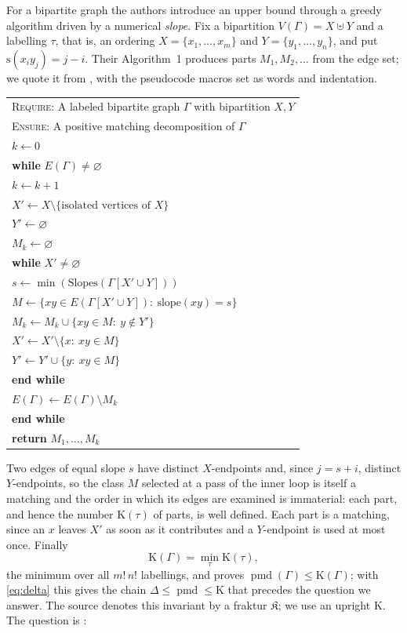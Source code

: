 \documentclass[11pt]{amsart}
\theoremstyle{remark}
\newcommand{\pmd}{\operatorname{pmd}}
\newcommand{\slope}{\mathrm{s}}
\newcommand{\Kinv}{\mathrm{K}}
\newcommand{\Gam}{\Gamma}
\begin{document}
For a bipartite graph the authors introduce an upper bound through a greedy
algorithm driven by a numerical \emph{slope}. Fix a bipartition
$V(\Gam)=X\uplus Y$ and a labelling $\tau$, that is, an ordering
$X=\{x_1,\dots,x_m\}$ and $Y=\{y_1,\dots,y_n\}$, and put
$\slope(x_iy_j)=j-i$. Their Algorithm~1 produces parts $M_1,M_2,\dots$ from the
edge set; we quote it from \cite{FGY}, with the pseudocode macros set as words
and indentation.

\medskip
\begin{center}\small
\begin{tabular}{@{}l@{}}
\textsc{Require}: A labeled bipartite graph $\Gam$ with bipartition $X,Y$\\
\textsc{Ensure}: A positive matching decomposition of $\Gam$\\
$k\longleftarrow 0$\\
\textbf{while} $E(\Gam)\neq\varnothing$\\
\quad $k\longleftarrow k+1$\\
\quad $X'\longleftarrow X\setminus\{\text{isolated vertices of }X\}$\\
\quad $Y'\longleftarrow\varnothing$\\
\quad $M_k\longleftarrow\varnothing$\\
\quad \textbf{while} $X'\neq\varnothing$\\
\quad\quad $s\longleftarrow\min(\mathrm{Slopes}(\Gam[X'\cup Y]))$\\
\quad\quad $M\longleftarrow\{xy\in E(\Gam[X'\cup Y])\colon\ \mathrm{slope}(xy)=s\}$\\
\quad\quad $M_k\longleftarrow M_k\cup\{xy\in M\colon\ y\notin Y'\}$\\
\quad\quad $X'\longleftarrow X'\setminus\{x\colon\ xy\in M\}$\\
\quad\quad $Y'\longleftarrow Y'\cup\{y\colon\ xy\in M\}$\\
\quad \textbf{end while}\\
\quad $E(\Gam)\longleftarrow E(\Gam)\setminus M_k$\\
\textbf{end while}\\
\textbf{return} $M_1,\ldots,M_k$
\end{tabular}
\end{center}

\medskip
Two edges of equal slope $s$ have distinct $X$-endpoints and, since $j=s+i$,
distinct $Y$-endpoints, so the class $M$ selected at a pass of the inner loop is
itself a matching and the order in which its edges are examined is immaterial:
each part, and hence the number $\Kinv(\tau)$ of parts, is well defined. Each
part is a matching, since an $x$ leaves $X'$ as soon as it contributes and a
$Y$-endpoint is used at most once. Finally
\begin{equation}\label{eq:K}
  \Kinv(\Gam)=\min_\tau \Kinv(\tau),
\end{equation}
the minimum over all $m!\,n!$ labellings, and \cite{FGY} proves
$\pmd(\Gam)\le\Kinv(\Gam)$; with \eqref{eq:delta} this gives the chain
$\Delta\le\pmd\le\Kinv$ that precedes the question we answer. The source denotes
this invariant by a fraktur $\mathfrak{K}$; we use an upright $\Kinv$. The
question is \cite[Question~1]{FGY}:
\end{document}
